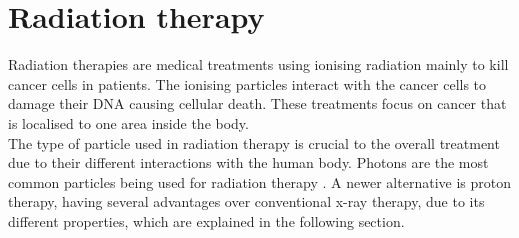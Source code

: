 %
%

\chapter{Radiation therapy}
Radiation therapies \cite{med} are medical treatments using ionising radiation mainly to kill cancer cells in patients. The ionising particles interact with the
cancer cells to damage their DNA causing cellular death. These treatments focus on cancer that is localised to one area inside the body. \\
The type of particle used in radiation therapy is crucial to the overall treatment due to their different interactions with the human body.
Photons are the most common particles being used for radiation therapy \cite{pbt}.
A newer alternative is proton therapy, having several advantages over conventional x-ray therapy, due to its different properties, which are explained in the following section.


